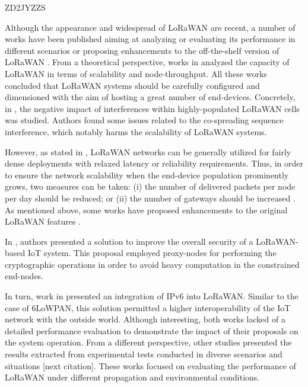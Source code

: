 \cite{sanchez-iborra_performance_2018} ZD2JYZZS


Although the appearance and widespread of LoRaWAN are recent,
	a number of works have been published aiming at analyzing or evaluating its performance in different scenarios or proposing enhancements to the off-the-shelf version of LoRaWAN \cite{herrera-tapia_evaluating_2017}.
From a theoretical perspective,
	works in \cite{georgiou_low_2017}\cite{mikhaylov_analysis_2016}\cite{bankov_limits_2016} analyzed the capacity of LoRaWAN in terms of scalability and node-throughput.
All these works concluded that LoRaWAN systems should be carefully configured and dimensioned with the aim of hosting a great number of end-devices.
Concretely,
	in \cite{georgiou_low_2017},
	the negative impact of interferences within highly-populated LoRaWAN cells was studied.
Authors found some issues related to the co-spreading sequence interference,
	which notably harms the scalability of LoRaWAN systems.

However,
	as stated in \cite{mikhaylov_analysis_2016},
	LoRaWAN networks can be generally utilized for fairly dense deployments with relaxed latency or reliability requirements.
Thus,
	in order to ensure the network scalability when the end-device population prominently grows,
	two measures can be taken:
	(i) the number of delivered packets per node per day should be reduced;
	or (ii) the number of gateways should be increased \cite{bankov_limits_2016}.
As mentioned above,
	some works have proposed enhancements to the original LoRaWAN features \cite{naoui_enhancing_2016}\cite{weber_ipv6_2016}.

In \cite{naoui_enhancing_2016},
	authors presented a solution to improve the overall security of a LoRaWAN-based IoT system.
This proposal employed proxy-nodes for performing the cryptographic operations in order to avoid heavy computation in the constrained end-nodes.

In turn,
	work in \cite{weber_ipv6_2016} presented an integration of IPv6 into LoRaWAN.
Similar to the case of 6LoWPAN,
	this solution permitted a higher interoperability of the IoT network with the outside world.
Although interesting,
	both works lacked of a detailed performance evaluation to demonstrate the impact of their proposals on the system operation.
From a different perspective,
	other studies presented the results extracted from experimental tests conducted in diverse scenarios and situations [next citation].
These works focused on evaluating the performance of LoRaWAN under different propagation and environmental conditions.

